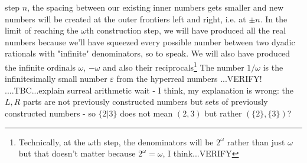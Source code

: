 step $n$, the spacing between our existing inner numbers gets smaller and new numbers will be created at the outer frontiers left and right, i.e. at $\pm n$. In the limit of reaching the $\omega$th construction step, we will have produced all the real numbers because we'll have squeezed every possible number between two dyadic rationals with "infinite" denominators, so to speak. We will also have produced the infinite ordinals $\omega$, $-\omega$ and also their reciprocals\footnote{Technically, at the $\omega$th step, the denominators will be $2^\omega$ rather than just $\omega$ but that doesn't matter because $2^\omega = \omega$, I think...VERIFY} The number $1/\omega$ is the infinitesimally small number $\varepsilon$ from the hyperreal numbers ...VERIFY! ....TBC...explain surreal arithmetic  wait - I think, my explanation is wrong: the $L,R$ parts are not previously constructed numbers but sets of previously constructed numbers - so $\{2|3\}$ does not mean $(2,3)$ but rather $(\{2\},\{3\})$?











